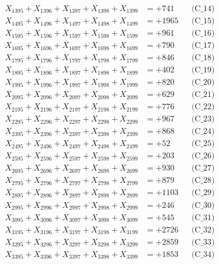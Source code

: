 \documentclass[a4paper,10pt]{article}
\begin{document}
{\begin{align}
X_{1395} + X_{1396} + X_{1397} + X_{1398} + X_{1399} &= +741 && \text{(C\_14)} \\
X_{1495} + X_{1496} + X_{1497} + X_{1498} + X_{1499} &= +1965 && \text{(C\_15)} \\
\allowbreak
X_{1595} + X_{1596} + X_{1597} + X_{1598} + X_{1599} &= +961 && \text{(C\_16)} \\
X_{1695} + X_{1696} + X_{1697} + X_{1698} + X_{1699} &= +790 && \text{(C\_17)} \\
X_{1795} + X_{1796} + X_{1797} + X_{1798} + X_{1799} &= +846 && \text{(C\_18)} \\
X_{1895} + X_{1896} + X_{1897} + X_{1898} + X_{1899} &= +402 && \text{(C\_19)} \\
X_{1995} + X_{1996} + X_{1997} + X_{1998} + X_{1999} &= +820 && \text{(C\_20)} \\
\allowbreak
X_{2095} + X_{2096} + X_{2097} + X_{2098} + X_{2099} &= +629 && \text{(C\_21)} \\
X_{2195} + X_{2196} + X_{2197} + X_{2198} + X_{2199} &= +776 && \text{(C\_22)} \\
X_{2295} + X_{2296} + X_{2297} + X_{2298} + X_{2299} &= +967 && \text{(C\_23)} \\
X_{2395} + X_{2396} + X_{2397} + X_{2398} + X_{2399} &= +868 && \text{(C\_24)} \\
X_{2495} + X_{2496} + X_{2497} + X_{2498} + X_{2499} &= +52 && \text{(C\_25)} \\
\allowbreak
X_{2595} + X_{2596} + X_{2597} + X_{2598} + X_{2599} &= +203 && \text{(C\_26)} \\
X_{2695} + X_{2696} + X_{2697} + X_{2698} + X_{2699} &= +930 && \text{(C\_27)} \\
X_{2795} + X_{2796} + X_{2797} + X_{2798} + X_{2799} &= +879 && \text{(C\_28)} \\
X_{2895} + X_{2896} + X_{2897} + X_{2898} + X_{2899} &= +1103 && \text{(C\_29)} \\
X_{2995} + X_{2996} + X_{2997} + X_{2998} + X_{2999} &= +246 && \text{(C\_30)} \\
\allowbreak
X_{3095} + X_{3096} + X_{3097} + X_{3098} + X_{3099} &= +545 && \text{(C\_31)} \\
X_{3195} + X_{3196} + X_{3197} + X_{3198} + X_{3199} &= +2726 && \text{(C\_32)} \\
X_{3295} + X_{3296} + X_{3297} + X_{3298} + X_{3299} &= +2859 && \text{(C\_33)} \\
X_{3395} + X_{3396} + X_{3397} + X_{3398} + X_{3399} &= +1853 && \text{(C\_34)} \\

\end{align}}
\end{document}
